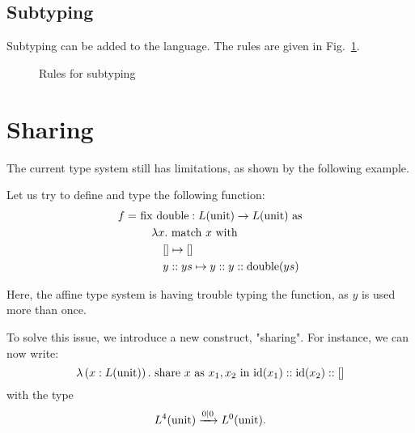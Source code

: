 \documentclass[ manuscript,screen, nonacm]{acmart}
\begin{document}
\subsection{Subtyping}

Subtyping can be added to the language. The rules are given in Fig.~\ref{fig:subtyping}.

\begin{figure}
    \caption{Rules for subtyping}
    \label{fig:subtyping}
\end{figure}

\section{Sharing}

The current type system still has limitations, as shown by the following example.
\begin{example}
  Let us try to define and type the following function:
  \begin{align*}
    f =\ &\mathrm{fix~double}: L(\mathrm{unit}) \rightarrow L(\mathrm{unit})~\mathrm{as}\\
      &\quad \lambda x.~\mathrm{match}~x~\mathrm{with} \\
      &\quad\quad [] \mapsto []\\
      &\quad\quad y::ys \mapsto y::y::\mathrm{double}(ys)
  \end{align*}
  
  Here, the affine type system is having trouble typing the function, as \(y\) is used
  more than once.
\end{example}

To solve this issue, we introduce a new construct, "sharing".
For instance, we can now write:
\[
  \lambda\left(x:L(\mathrm{unit})\right).~\mathrm{share}~x~\mathrm{as}~x_1,x_2~\mathrm{in}~\mathrm{id}(x_1)::\mathrm{id}(x_2)::[]
\]
with the type
\[
L^4(\mathrm{unit}) \xrightarrow{0|0} L^0(\mathrm{unit}).
\]
\end{document}
